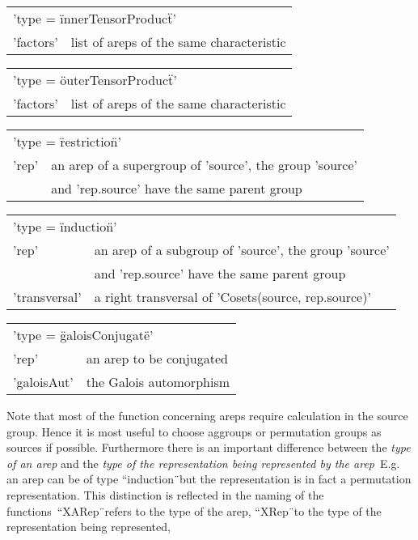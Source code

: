 \begin{tabular}{p{2.5cm}p{10cm}}
\multicolumn{2}{l}{'type = \"innerTensorProduct\"\:'}\\
'factors'    & list of areps of the same characteristic
\end{tabular}

\begin{tabular}{p{2.5cm}p{10cm}}
\multicolumn{2}{l}{'type = \"outerTensorProduct\"\:'}\\
'factors'    & list of areps of the same characteristic
\end{tabular}

\begin{tabular}{p{2.5cm}p{10cm}}
\multicolumn{2}{l}{'type = \"restriction\"\:'}\\
'rep'    & an arep of a supergroup of 'source', the group 'source'\\
 & and 'rep.source' have the same parent group
\end{tabular}

\begin{tabular}{p{2.5cm}p{10cm}}
\multicolumn{2}{l}{'type = \"induction\"\:'}\\
'rep'    & an arep of a subgroup of 'source', the group 'source'\\
 & and 'rep.source' have the same parent group\\
'transversal' & a right transversal of 'Cosets(source, rep.source)'
\end{tabular}

\begin{tabular}{p{2.5cm}p{10cm}}
\multicolumn{2}{l}{'type = \"galoisConjugate\"\:'}\\
'rep'    & an arep to be conjugated\\
'galoisAut' & the Galois automorphism
\end{tabular}

\bigskip
Note that most of the function concerning areps require calculation in
the source group. Hence it is most useful to choose aggroups or
permutation groups as sources if possible. Furthermore there is an
important difference between the {\em type of an arep} and the {\em
type of the representation being represented by the arep}\:\ E.g. an
arep can be of type ``induction\"\ but the representation is in fact a
permutation representation.  This distinction is reflected in the
naming of the functions\:\ ``XARep\"\ refers to the type of the arep,
``XRep\"\ to the type of the representation being represented,

